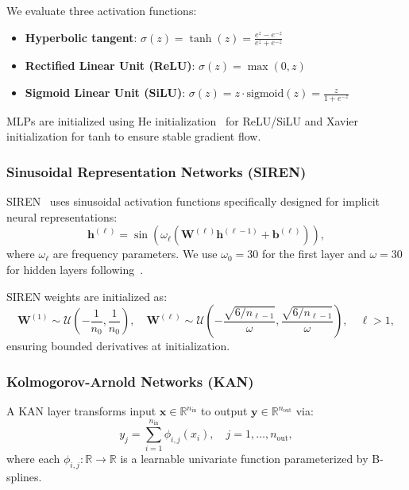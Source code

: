 \documentclass[11pt,a4paper]{article}
\newcommand{\R}{\mathbb{R}}
\begin{document}
We evaluate three activation functions:
\begin{itemize}
    \item \textbf{Hyperbolic tangent}: $\sigma(z) = \tanh(z) = \frac{e^z - e^{-z}}{e^z + e^{-z}}$
    \item \textbf{Rectified Linear Unit (ReLU)}: $\sigma(z) = \max(0, z)$
    \item \textbf{Sigmoid Linear Unit (SiLU)}: $\sigma(z) = z \cdot \text{sigmoid}(z) = \frac{z}{1 + e^{-z}}$
\end{itemize}

MLPs are initialized using He initialization~\citep{kingma2015adam} for ReLU/SiLU and Xavier initialization for tanh to ensure stable gradient flow.

\subsubsection{Sinusoidal Representation Networks (SIREN)}

SIREN~\citep{sitzmann2020implicit} uses sinusoidal activation functions specifically designed for implicit neural representations:
\begin{equation}
\mathbf{h}^{(\ell)} = \sin\left(\omega_\ell \left(\mathbf{W}^{(\ell)} \mathbf{h}^{(\ell-1)} + \mathbf{b}^{(\ell)}\right)\right),
\end{equation}
where $\omega_\ell$ are frequency parameters. We use $\omega_0 = 30$ for the first layer and $\omega = 30$ for hidden layers following~\citet{sitzmann2020implicit}.

SIREN weights are initialized as:
\begin{equation}
\mathbf{W}^{(1)} \sim \mathcal{U}\left(-\frac{1}{n_0}, \frac{1}{n_0}\right), \quad \mathbf{W}^{(\ell)} \sim \mathcal{U}\left(-\frac{\sqrt{6/n_{\ell-1}}}{\omega}, \frac{\sqrt{6/n_{\ell-1}}}{\omega}\right), \quad \ell > 1,
\end{equation}
ensuring bounded derivatives at initialization.

\subsubsection{Kolmogorov-Arnold Networks (KAN)}

A KAN layer transforms input $\mathbf{x} \in \R^{n_{\text{in}}}$ to output $\mathbf{y} \in \R^{n_{\text{out}}}$ via:
\begin{equation}
y_j = \sum_{i=1}^{n_{\text{in}}} \phi_{i,j}(x_i), \quad j = 1, \ldots, n_{\text{out}},
\end{equation}
where each $\phi_{i,j}: \R \to \R$ is a learnable univariate function parameterized by B-splines.
\end{document}
